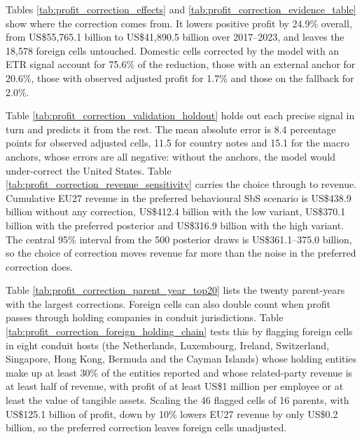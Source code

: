 \documentclass[11pt,a4paper]{article}
\newcommand{\usd}{US\$}
\begin{document}



Tables \ref{tab:profit_correction_effects} and \ref{tab:profit_correction_evidence_table} show where the correction comes from. It lowers positive profit by 24.9\% overall, from \usd55,765.1 billion to \usd41,890.5 billion over 2017–2023, and leaves the 18,578 foreign cells untouched. Domestic cells corrected by the model with an ETR signal account for 75.6\% of the reduction, those with an external anchor for 20.6\%, those with observed adjusted profit for 1.7\% and those on the fallback for 2.0\%.




Table \ref{tab:profit_correction_validation_holdout} holds out each precise signal in turn and predicts it from the rest. The mean absolute error is 8.4 percentage points for observed adjusted cells, 11.5 for country notes and 15.1 for the macro anchors, whose errors are all negative: without the anchors, the model would under-correct the United States. Table \ref{tab:profit_correction_revenue_sensitivity} carries the choice through to revenue. Cumulative EU27 revenue in the preferred behavioural SbS scenario is \usd438.9 billion without any correction, \usd412.4 billion with the low variant, \usd370.1 billion with the preferred posterior and \usd316.9 billion with the high variant. The central 95\% interval from the 500 posterior draws is \usd361.1–375.0 billion, so the choice of correction moves revenue far more than the noise in the preferred correction does.




Table \ref{tab:profit_correction_parent_year_top20} lists the twenty parent-years with the largest corrections. Foreign cells can also double count when profit passes through holding companies in conduit jurisdictions. Table \ref{tab:profit_correction_foreign_holding_chain} tests this by flagging foreign cells in eight conduit hosts (the Netherlands, Luxembourg, Ireland, Switzerland, Singapore, Hong Kong, Bermuda and the Cayman Islands) whose holding entities make up at least 30\% of the entities reported and whose related-party revenue is at least half of revenue, with profit of at least \usd1 million per employee or at least the value of tangible assets. Scaling the 46 flagged cells of 16 parents, with \usd125.1 billion of profit, down by 10\% lowers EU27 revenue by only \usd0.2 billion, so the preferred correction leaves foreign cells unadjusted.
\end{document}
